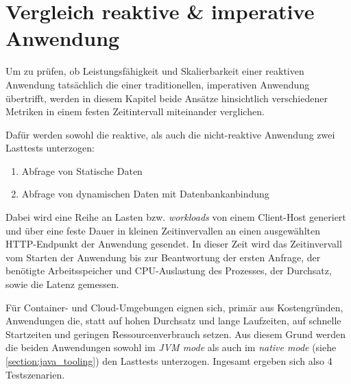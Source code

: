 \section {Vergleich reaktive \& imperative Anwendung}
\label{section:vergleich_reaktiv_imperativ}
Um zu prüfen, ob Leistungsfähigkeit und Skalierbarkeit einer reaktiven Anwendung tatsächlich die einer traditionellen, imperativen Anwendung
übertrifft, werden in diesem Kapitel beide Ansätze hinsichtlich verschiedener Metriken in einem festen Zeitintervall miteinander verglichen.

Dafür werden sowohl die reaktive, als auch die nicht-reaktive Anwendung zwei Lasttests unterzogen:
\begin{enumerate}
    \item Abfrage von Statische Daten
    \item Abfrage von dynamischen Daten mit Datenbankanbindung
\end{enumerate}
Dabei wird eine Reihe an Lasten bzw. \textit{workloads} von einem Client-Host generiert und über eine feste Dauer in kleinen Zeitinvervallen
an einen ausgewählten HTTP-Endpunkt der Anwendung gesendet.
In dieser Zeit wird das Zeitinvervall vom Starten der Anwendung bis zur Beantwortung der ersten Anfrage,
der benötigte Arbeitsspeicher und CPU-Auslastung des Prozesses, der Durchsatz, sowie die Latenz gemessen.

Für Container- und Cloud-Umgebungen eignen sich, primär aus Kostengründen, Anwendungen die, statt auf hohen Durchsatz und lange Laufzeiten, auf
schnelle Startzeiten und geringen Ressourcenverbrauch setzen.
Aus diesem Grund werden die beiden Anwendungen sowohl im \textit{JVM mode} als auch im \textit{native mode}
(siehe \ref{section:java_tooling}) den Lasttests unterzogen. Ingesamt ergeben sich also 4 Testszenarien.


